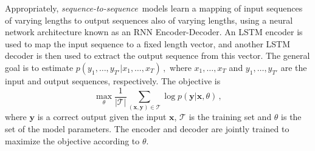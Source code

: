 \documentclass{article}
\newcommand{\T}{\mathcal{T}}
\newcommand{\seqtoseq}{\textit{sequence-to-sequence}}
\begin{document}
Appropriately, \seqtoseq\ models learn a mapping of input sequences of varying lengths to output sequences also of varying lengths, using a neural network architecture known as an RNN Encoder-Decoder. 
An LSTM encoder is used to map the input sequence to a fixed length vector, and another LSTM decoder is then used to extract the output sequence from this vector. The general goal is to estimate 
$
p(y_1,\ldots,y_{T'} | x_1, \ldots, x_T)\,,
$
where $x_1, \ldots, x_T$ and  $y_1,\ldots,y_{T'}$
are the input and output sequences, respectively. %
%
The objective is
%
\begin{equation}
\max_{\theta} \frac{1}{|\T|} \sum_{(\boldsymbol{x},\boldsymbol{y}) \in \T} \log p(\boldsymbol{y}|\boldsymbol{x},\theta) \,,
\label{eq:seq2seq_obj}
\end{equation}
%
where $\boldsymbol{y}$ is a correct output given the input $\boldsymbol{x}$, $\T$ is the training set and $\theta$ is the set of the model parameters. 
The encoder and decoder are jointly trained to maximize the objective according to $\theta$.
\end{document}
